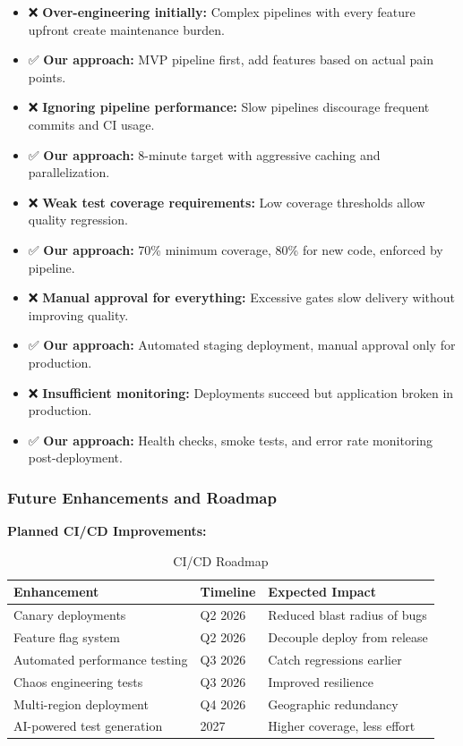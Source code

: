 \documentclass[12pt,a4paper]{article}
\begin{document}
\begin{itemize}[leftmargin=2em, itemsep=6pt]
    \item ❌ \textbf{Over-engineering initially:} Complex pipelines with every feature upfront create maintenance burden.
    \item ✅ \textbf{Our approach:} MVP pipeline first, add features based on actual pain points.
    
    \item ❌ \textbf{Ignoring pipeline performance:} Slow pipelines discourage frequent commits and CI usage.
    \item ✅ \textbf{Our approach:} 8-minute target with aggressive caching and parallelization.
    
    \item ❌ \textbf{Weak test coverage requirements:} Low coverage thresholds allow quality regression.
    \item ✅ \textbf{Our approach:} 70\% minimum coverage, 80\% for new code, enforced by pipeline.
    
    \item ❌ \textbf{Manual approval for everything:} Excessive gates slow delivery without improving quality.
    \item ✅ \textbf{Our approach:} Automated staging deployment, manual approval only for production.
    
    \item ❌ \textbf{Insufficient monitoring:} Deployments succeed but application broken in production.
    \item ✅ \textbf{Our approach:} Health checks, smoke tests, and error rate monitoring post-deployment.
\end{itemize}

\subsubsection{Future Enhancements and Roadmap}

\textbf{Planned CI/CD Improvements:}

\begin{table}[H]
\centering
\begin{tabular}{|p{5cm}|p{4cm}|p{4cm}|}
\hline
\textbf{Enhancement} & \textbf{Timeline} & \textbf{Expected Impact} \\
\hline
Canary deployments & Q2 2026 & Reduced blast radius of bugs \\
\hline
Feature flag system & Q2 2026 & Decouple deploy from release \\
\hline
Automated performance testing & Q3 2026 & Catch regressions earlier \\
\hline
Chaos engineering tests & Q3 2026 & Improved resilience \\
\hline
Multi-region deployment & Q4 2026 & Geographic redundancy \\
\hline
AI-powered test generation & 2027 & Higher coverage, less effort \\
\hline
\end{tabular}
\caption{CI/CD Roadmap}
\end{table}
\end{document}
